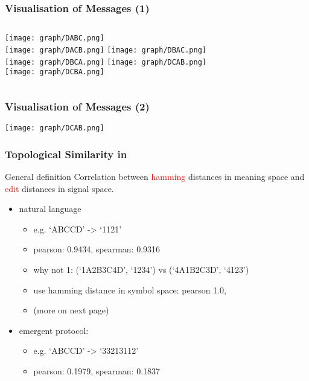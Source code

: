 \documentclass[compress,mathserif,xcolor=dvipsnames,svgnames,aspectratio=43]{beamer}
\begin{document}
\begin{frame}[c]
  \frametitle{Visualisation of Messages (1)}
  \begin{columns}
    \texttt{[image: graph/DABC.png]} \\
    \texttt{[image: graph/DACB.png]}
    \texttt{[image: graph/DBAC.png]} \\
    \texttt{[image: graph/DBCA.png]}
    \texttt{[image: graph/DCAB.png]} \\
    \texttt{[image: graph/DCBA.png]}
  \end{columns}
\end{frame}

\begin{frame}[c]
  \frametitle{Visualisation of Messages (2)}
  \texttt{[image: graph/DCAB.png]}
\end{frame}

\begin{frame}[c]
  \frametitle{Topological Similarity in \cite{brighton2006understanding}}
  \begin{block}{General definition}
    Correlation between \textcolor{red}{hamming} distances in meaning space and \textcolor{red}{edit} distances in signal space.
  \end{block}
  \begin{itemize}
    \item natural language
      \begin{itemize}
        \item e.g. `ABCCD' -> `1121'
        \item pearson: 0.9434, spearman: 0.9316
        \item why not 1: (`1A2B3C4D', `1234') vs (`4A1B2C3D', `4123')
        \item use hamming distance in symbol space: pearson 1.0, 
        \item (more on next page)
      \end{itemize}
    \item emergent protocol:
    \begin{itemize}
      \item e.g. `ABCCD' -> `33213112'
      \item pearson: 0.1979, spearman: 0.1837
    \end{itemize}
  \end{itemize}
\end{frame}
\end{document}
